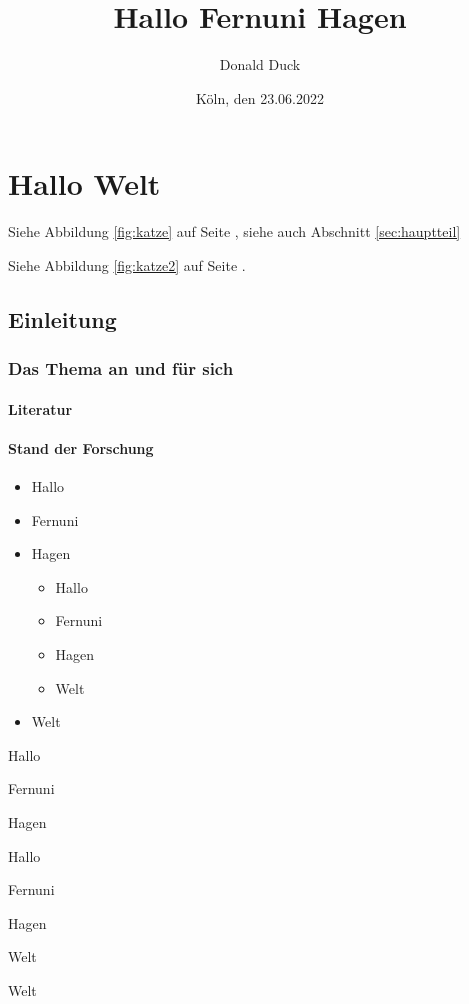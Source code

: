 \documentclass[12pt,ngerman,parskip=half]{scrreprt}
\author{Donald Duck}
\title{Hallo Fernuni Hagen}
\date{Köln, den 23.06.2022}
\begin{document}
\maketitle

\tableofcontents

\listoffigures

\chapter{Hallo Welt}

Siehe Abbildung \ref{fig:katze} auf Seite \pageref{fig:katze}, siehe auch Abschnitt \ref{sec:hauptteil}

Siehe Abbildung \ref{fig:katze2} auf Seite \pageref{fig:katze2}.

\section{Einleitung}
\subsection{Das Thema an und für sich}
\subsubsection{Literatur}

\blindtext[2] 

\subsubsection{Stand der Forschung}

\blindtext[1] 


\begin{itemize} %
\item Hallo
\item Fernuni
\item Hagen
\begin{itemize}[+]
\item Hallo
\item Fernuni
\item Hagen
\item Welt
\end{itemize}
\item Welt
\end{itemize}

\begin{compactitem}[\%] %
\item Hallo
\item Fernuni
\item Hagen
\begin{compactitem}[+]
\item Hallo
\item Fernuni
\item Hagen
\item Welt
\end{compactitem}
\item Welt
\end{compactitem}
\end{document}
